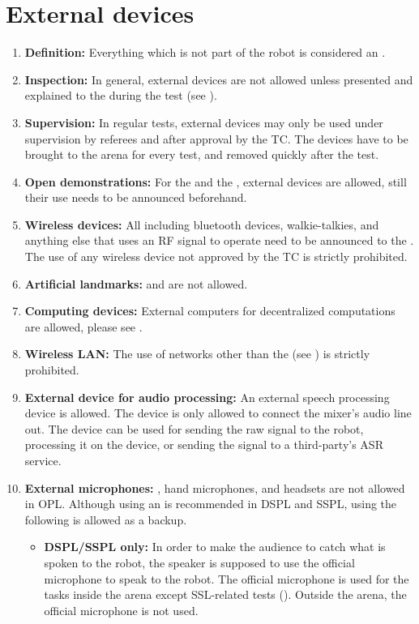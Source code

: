 \section{External devices}\label{rule:roobt_external_devices}
\begin{enumerate}
	\item \textbf{Definition:} Everything which is not part of the robot is considered an . 
	\item \textbf{Inspection:} In general, external devices are not allowed unless presented and explained to the  during the  test (see ).
	\item \textbf{Supervision:} In regular tests, external devices may only be used under supervision by referees and after approval by the TC. The devices have to be brought to the arena for every test, and removed quickly after the test.
	\item \textbf{Open demonstrations:} For the  and the , external devices are allowed, still their use needs to be announced beforehand.
	\item \textbf{Wireless devices:} All  including bluetooth devices, walkie-talkies, and anything else that uses an RF signal to operate need to be announced to the . The use of any wireless device not approved by the TC is strictly prohibited.  
	\item \textbf{Artificial landmarks:}  and  are not allowed.
	\item \textbf{Computing devices:} External computers for decentralized computations are allowed, please see .
	\item \textbf{Wireless LAN:} The use of networks other than the  (see ) is strictly prohibited.
	\item \textbf{External device for audio processing: }An external speech processing device is allowed. The device is only allowed to connect the mixer's audio line out. The device can be used for sending the raw signal to the robot, processing it on the device, or sending the signal to a third-party's ASR service.
	\item \textbf{External microphones: }, hand microphones, and headsets are not allowed in OPL. Although using an  is recommended in DSPL and SSPL, using the following  is allowed as a backup. 
	\begin{itemize}
	\item \textbf{DSPL/SSPL only: }In order to make the audience to catch what is spoken to the robot, the speaker is supposed to use the official microphone to speak to the robot. The official microphone is used for the tasks inside the arena except SSL-related tests (). Outside the arena, the official microphone is not used.
	\end{itemize}
\end{enumerate}


